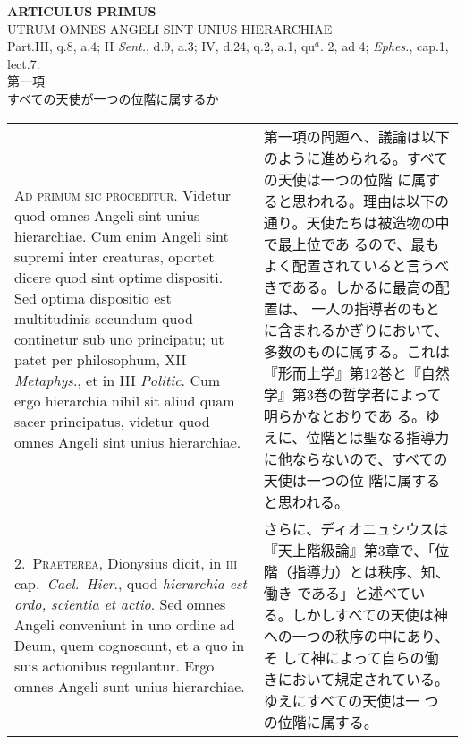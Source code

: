 \documentclass[10pt]{jsarticle} %
\begin{document}
\begin{center}
{\Large {\bf ARTICULUS PRIMUS}}\\
{\large UTRUM OMNES ANGELI SINT UNIUS HIERARCHIAE}\\
{\footnotesize Part.III, q.8, a.4; II {\itshape Sent.}, d.9, a.3; IV,
 d.24, q.2, a.1, qu$^{a}$. 2, ad 4; {\itshape Ephes.}, cap.1, lect.7.}\\
{\Large 第一項\\すべての天使が一つの位階に属するか}
\end{center}

\begin{longtable}{p{21em}p{21em}}

{\scshape Ad primum sic proceditur}. Videtur quod omnes Angeli sint unius
hierarchiae. Cum enim Angeli sint supremi inter creaturas, oportet
dicere quod sint optime dispositi. Sed optima dispositio est
multitudinis secundum quod continetur sub uno principatu; ut patet per
philosophum, XII {\itshape Metaphys}., et in III {\itshape Politic}. Cum ergo hierarchia
nihil sit aliud quam sacer principatus, videtur quod omnes Angeli sint
unius hierarchiae.

&

第一項の問題へ、議論は以下のように進められる。すべての天使は一つの位階
に属すると思われる。理由は以下の通り。天使たちは被造物の中で最上位であ
るので、最もよく配置されていると言うべきである。しかるに最高の配置は、
一人の指導者のもとに含まれるかぎりにおいて、多数のものに属する。これは
『形而上学』第12巻と『自然学』第3巻の哲学者によって明らかなとおりであ
る。ゆえに、位階とは聖なる指導力に他ならないので、すべての天使は一つの位
階に属すると思われる。

\\



2.~{\scshape Praeterea}, Dionysius dicit, in {\scshape iii} cap.~{\itshape Cael.~Hier}.,
quod {\itshape hierarchia est ordo, scientia et actio}. Sed omnes
Angeli conveniunt in uno ordine ad Deum, quem cognoscunt, et a quo in
suis actionibus regulantur. Ergo omnes Angeli sunt unius hierarchiae.

&

さらに、ディオニュシウスは『天上階級論』第3章で、「位階（指導力）とは秩序、知、働き
である」と述べている。しかしすべての天使は神への一つの秩序の中にあり、そ
して神によって自らの働きにおいて規定されている。ゆえにすべての天使は一
つの位階に属する。


\\



\end{longtable}
\end{document}
